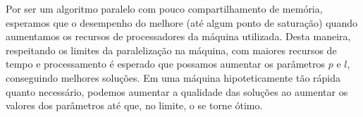 Por ser um algoritmo paralelo com pouco compartilhamento de memória, 
esperamos que o desempenho do  melhore (até algum ponto
de saturação) quando aumentamos os recursos de processadores da máquina
utilizada. Desta maneira, respeitando os limites da paralelização na 
máquina, com maiores recursos de tempo e processamento é esperado que 
possamos aumentar os parâmetros $p$ e $l$, conseguindo melhores 
soluções. Em uma máquina hipoteticamente tão rápida quanto necessário,
podemos aumentar a qualidade das soluções ao aumentar os valores dos
parâmetros até que, no limite, o  se torne ótimo.
